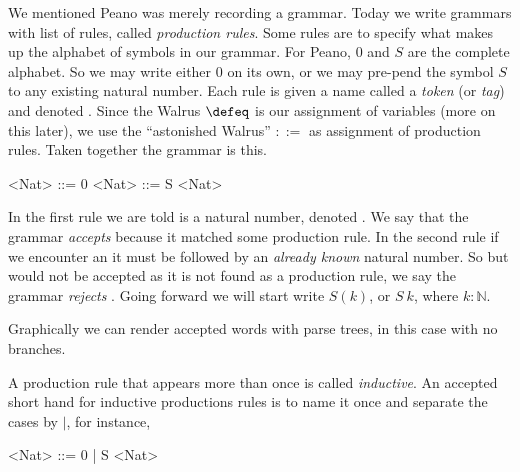 We mentioned Peano was merely recording a grammar.  Today we write grammars with 
list of rules, called \emph{production rules}.  Some rules are to specify 
what makes up the alphabet of symbols in our grammar.  For Peano, $0$ and $S$
are the complete alphabet.  So we may write either $0$ on its own, or 
we may pre-pend the symbol $S$ to any existing natural number.  
Each rule is given a name called a \emph{token} (or \emph{tag}) and 
denoted . Since the Walrus
$\defeq$ is our assignment of variables (more on this later), 
we use the ``astonished Walrus'' $::=$
as assignment of production rules.   Taken together the grammar is this.
\begin{center}
\begin{gcode}[]
<Nat> ::= 0 
<Nat> ::= S <Nat>
\end{gcode}
\end{center}
In the first rule we are told  is a natural number, denoted
. We say that the grammar \emph{accepts}  because it matched
some production rule.  In the second rule if we encounter an  it must be
followed by an \emph{already known} natural number.  So  but
 would not be accepted as it is not found as a production rule, we say
the grammar \emph{rejects} .  Going forward we will start write 
$S(k)$, or $S~k$, where $k:\mathbb{N}$.

Graphically we can render accepted words with parse trees, in this case with no branches.
\begin{center}
\end{center}

\begin{definition}
A production rule that appears more than once is called \emph{inductive}.
An accepted short hand for inductive productions rules is to name it once 
and separate the cases by $\mid$, for instance,
\begin{center}
\begin{gcode}[]
<Nat> ::= 0 | S <Nat>
\end{gcode}
\end{center}
\end{definition}



